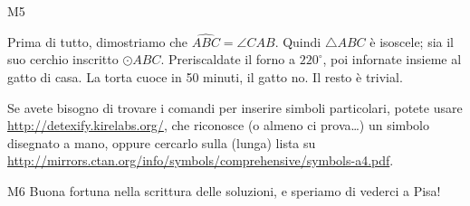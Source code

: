 \documentclass{stagetex}
\begin{document}
\begin{soluzione}{M5}
 \begin{steplist}
   Prima di tutto, dimostriamo che $\widehat{ABC}=\angle CAB$. Quindi $\triangle ABC$ è isoscele;
  sia il suo cerchio inscritto $\odot ABC$.
   Preriscaldate il forno a $220^\circ$, poi infornate insieme al gatto di casa. La torta cuoce in 50 minuti, il gatto no.
   Il resto è trivial.
 \end{steplist}
 
 Se avete bisogno di trovare i comandi per inserire simboli particolari, potete usare \url{http://detexify.kirelabs.org/},
 che riconosce (o almeno ci prova\dots) un simbolo disegnato a mano, oppure cercarlo sulla (lunga) lista su
 \url{http://mirrors.ctan.org/info/symbols/comprehensive/symbols-a4.pdf}.
\end{soluzione}
\begin{soluzione}{M6}
  Buona fortuna nella scrittura delle soluzioni, e speriamo di vederci a Pisa!
\end{soluzione}
\end{document}
